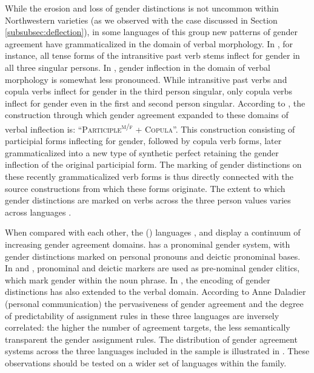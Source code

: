 \documentclass[output=collectionpaper]{langsci/langscibook}
\begin{document}
 
While the erosion and loss of gender distinctions is not uncommon within Northwestern  varieties (as we observed with the  case discussed in Section \ref{subsubsec:deflection}), in some languages of this group new patterns of gender agreement have grammaticalized in the domain of verbal morphology. In , for instance, all tense forms of the intransitive past verb stems inflect for gender in all three singular persons. In , gender inflection in the domain of verbal morphology is somewhat less pronounced. While intransitive past verbs and copula verbs inflect for gender in the third person singular, only copula verbs inflect for gender even in the first and second person singular. According to \citet{Stilotoappear}, the construction through which gender agreement expanded to these domains of verbal inflection is: ``\textsc{Participle}\textsuperscript{\textsc{m/f}} + \textsc{Copula}''. This construction consisting of participial forms  inflecting for gender, followed by copula verb forms, later grammaticalized into a new type of synthetic perfect retaining the gender inflection of the original participial form.  The marking of gender distinctions on these recently grammaticalized verb forms is thus directly connected with the source constructions from which these forms originate. The extent to which gender distinctions are marked on verbs across the three person values varies across languages \citep[29]{Stilotoappear}.

When compared with each other, the  () languages ,  and  display a continuum of increasing gender agreement domains.  has a pronominal gender system, with gender distinctions marked on personal pronouns and deictic pronominal bases. In  and , pronominal and deictic markers are used as pre-nominal gender clitics, which mark gender within the noun phrase. In , the encoding of gender distinctions has also extended to the verbal domain. According to Anne Daladier (personal communication) the pervasiveness of gender agreement and the degree of predictability of assignment rules in these three languages are inversely correlated: the higher the number of agreement targets, the less semantically transparent the gender assignment rules. The distribution of gender agreement systems across the three  languages included in the sample is illustrated in . These observations should be tested on a wider set of languages within the family.
\end{document}
